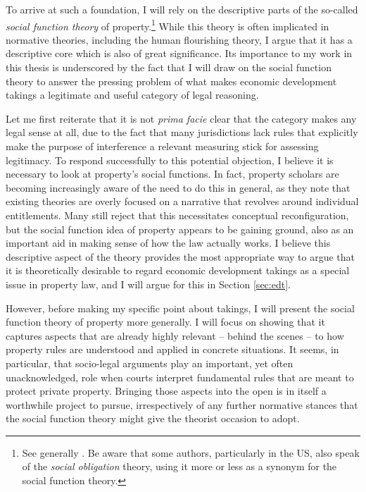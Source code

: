 To arrive at such a foundation, I will rely on the descriptive parts of the so-called {\it social function theory} of property.\footnote{See generally \cite{foster11,mirow10,alexander09a}. Be aware that some authors, particularly in the US, also speak of the {\it social obligation} theory, using it more or less as a synonym for the social function theory.} While this theory is often implicated in normative theories, including the human flourishing theory, I argue that it has a descriptive core which is also of great significance. Its importance to my work in this thesis is underscored by the fact that I will draw on the social function theory to answer the pressing problem of what makes economic development takings a legitimate and useful category of legal reasoning. 

Let me first reiterate that it is not {\it prima facie} clear that the category makes any legal sense at all, due to the fact that many jurisdictions lack rules that explicitly make the purpose of interference a relevant measuring stick for assessing legitimacy. To respond successfully to this potential objection, I believe it is necessary to look at property's social functions. In fact, property scholars are becoming increasingly aware of the need to do this in general, as they note that existing theories are overly focused on a narrative that revolves around individual entitlements. Many still reject that this necessitates conceptual reconfiguration, but the social function idea of property appears to be gaining ground, also as an important aid in making sense of how the law actually works. I believe this descriptive aspect of the theory provides the most appropriate way to argue that it is theoretically desirable to regard economic development takings as a special issue in property law, and I will argue for this in Section \ref{sec:edt}.

However, before making my specific point about takings, I will present the social function theory of property more generally. I will focus on showing that it captures aspects that are already highly relevant -- behind the scenes -- to how property rules are understood and applied in concrete situations. It seems, in particular, that socio-legal arguments play an important, yet often unacknowledged, role when courts interpret fundamental rules that are meant to protect private property. Bringing those aspects into the open is in itself a worthwhile project to pursue, irrespectively of any further normative stances that the social function theory might give the theorist occasion to adopt.

